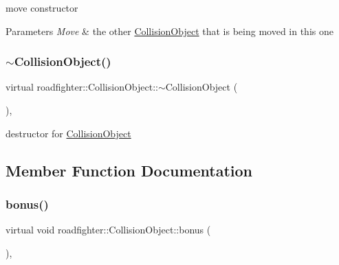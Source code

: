 move constructor 
\begin{DoxyParams}{Parameters}
{\em Move} & the other \hyperlink{classroadfighter_1_1CollisionObject}{Collision\+Object} that is being moved in this one \\
\hline
\end{DoxyParams}
\mbox{\label{classroadfighter_1_1CollisionObject_aabc3bc7bef3a50923856fd82e39f59a1}} 
\subsubsection{\texorpdfstring{$\sim$\+Collision\+Object()}{~CollisionObject()}}
{\footnotesize\ttfamily virtual roadfighter\+::\+Collision\+Object\+::$\sim$\+Collision\+Object (\begin{DoxyParamCaption}{ }\end{DoxyParamCaption})\hspace{0.3cm}{\ttfamily [virtual]}, {\ttfamily [default]}}

destructor for \hyperlink{classroadfighter_1_1CollisionObject}{Collision\+Object} 

\subsection{Member Function Documentation}
\mbox{\label{classroadfighter_1_1CollisionObject_ad35887bb3cfb8c054eaaee56306d6944}} 
\subsubsection{\texorpdfstring{bonus()}{bonus()}}
{\footnotesize\ttfamily virtual void roadfighter\+::\+Collision\+Object\+::bonus (\begin{DoxyParamCaption}{ }\end{DoxyParamCaption})\hspace{0.3cm}{\ttfamily [inline]}, {\ttfamily [virtual]}}

